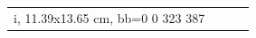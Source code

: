 \documentclass[a4paper,10pt]{report}
\begin{document}
\begin{figure}
\begin{center}
\begin{tabular}{c c c c }
i, 11.39x13.65 cm, bb=0 0 323 387
 
\end{tabular}
\end{center}
\end{figure}
\end{document}
